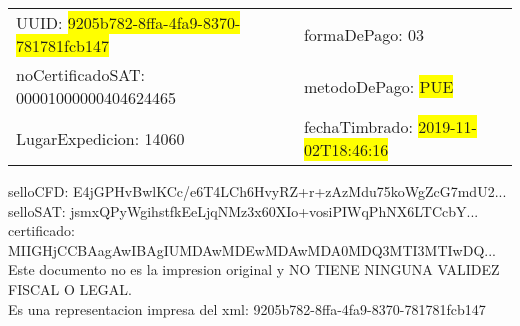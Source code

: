 \documentclass{article}
\begin{document}
\begin{tabular}{p{11cm}p{1cm}p{8cm}}
\bigskip
UUID: \colorbox{yellow}{ 9205b782-8ffa-4fa9-8370-781781fcb147 } & & formaDePago: 03\\

noCertificadoSAT: 00001000000404624465 & & metodoDePago: \colorbox{yellow}{ PUE }\\

LugarExpedicion: 14060 & & fechaTimbrado: \colorbox{yellow}{ 2019-11-02T18:46:16 } \\
\end{tabular}

\bigskip
selloCFD: E4jGPHvBwlKCc/e6T4LCh6HvyRZ+r+zAzMdu75koWgZcG7mdU2... \\
selloSAT: jsmxQPyWgihstfkEeLjqNMz3x60XIo+vosiPIWqPhNX6LTCcbY... \\

certificado: MIIGHjCCBAagAwIBAgIUMDAwMDEwMDAwMDA0MDQ3MTI3MTIwDQ...\bigskip\bigskip\bigskip\bigskip\bigskip\bigskip
\\Este documento no es la impresion original y NO TIENE NINGUNA VALIDEZ FISCAL O LEGAL. \\
 Es una representacion impresa del xml:  9205b782-8ffa-4fa9-8370-781781fcb147 \\
\end{document}
